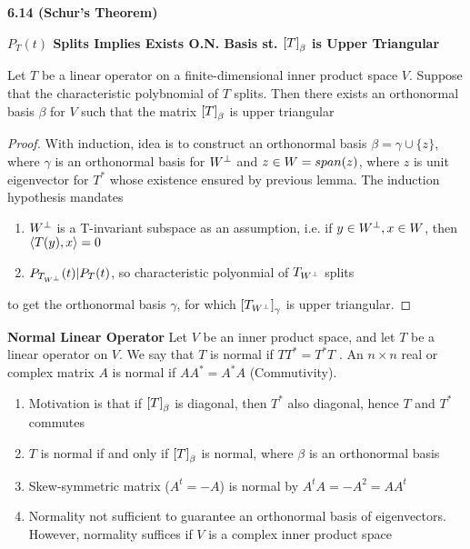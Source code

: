 \documentclass[11pt]{article}
\begin{document}
\begin{theorem*}
    \textbf{6.14 (Schur's Theorem)}
    \begin{center}
        \textbf{$P_T(t)$ Splits Implies Exists O.N. Basis st. $\left[ T \right]_{\beta}$ is Upper Triangular}
    \end{center}
    Let $T$ be a linear operator on a finite-dimensional inner product space $V$. Suppose that the characteristic polybnomial of $T$ splits. Then there exists an orthonormal basis $\beta$ for $V$ such that the matrix $\left[ T \right]_{\beta}$ is upper triangular
    \begin{proof}
        With induction, idea is to construct an orthonormal basis $\beta = \gamma \cup \{z\}$, where $\gamma$ is an orthonormal basis for $W^{\perp}$ and $z\in W = span(z)$, where $z$ is unit eigenvector for $T^*$ whose existence ensured by previous lemma. The induction hypothesis mandates
        \begin{enumerate}
            \item $W^{\perp}$ is a T-invariant subspace as an assumption, i.e. if $y\in W^{\perp}, x\in W$, then $\langle T(y),x\rangle = 0$
            \item $P_{T_{W^{\perp}}}(t) | P_T(t)$, so characteristic polyonmial of $T_{W^{\perp}}$ splits
        \end{enumerate}
        to get the orthonormal basis $\gamma$, for which $\left[ T_{W^{\perp}} \right]_{\gamma}$ is upper triangular.
    \end{proof} 
\end{theorem*}

\begin{defn*}
    \textbf{Normal Linear Operator} Let $V$ be an inner product space, and let $T$ be a linear operator on $V$. We say that $T$ is normal if $TT^* = T^*T$ . An $n\times n$ real or complex matrix $A$ is normal if $AA^* = A^*A$ (Commutivity). 
    \begin{enumerate}
        \item Motivation is that if $\left[ T \right]_{\beta}$ is diagonal, then $T^*$ also diagonal, hence $T$ and $T^*$ commutes
        \item $T$ is normal if and only if $\left[ T \right]_{\beta}$ is normal, where $\beta$ is an orthonormal basis
        \item Skew-symmetric matrix ($A^t = -A$) is normal by $A^tA = -A^2 = AA^t$
        \item Normality not sufficient to guarantee an orthonormal basis of eigenvectors. However, normality suffices if $V$ is a complex inner product space
    \end{enumerate}
\end{defn*}
\end{document}
